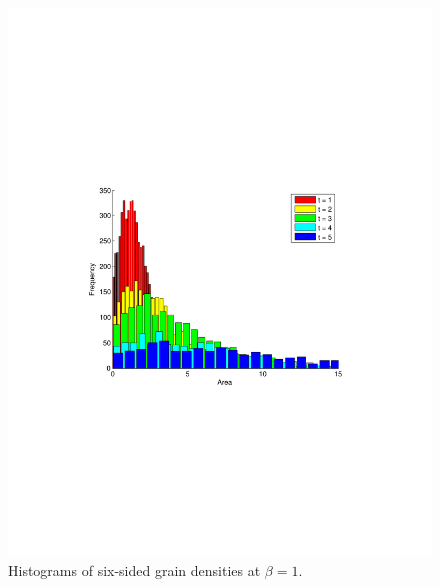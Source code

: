 \begin{figure}
\includegraphics[width=\textwidth]{histbetaonetier6.pdf}
\vspace{-130pt}
\caption{Histograms of six-sided grain densities at $\beta = 1$.}
\end{figure}

\clearpage{}



